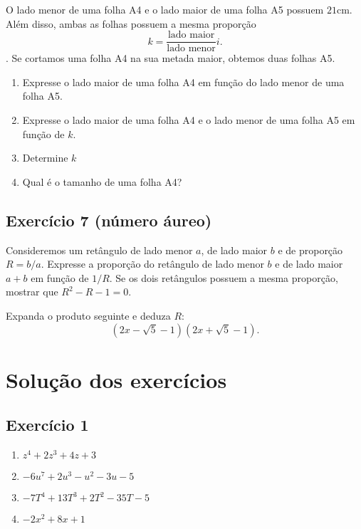 O lado menor de uma folha A4 e o lado maior de uma folha A5 possuem $21$cm. Além
disso, ambas as folhas possuem a mesma proporção
$$k = \frac{\text{lado maior}}{\text{lado menor}}i.$$. Se cortamos uma folha A4
na sua metada maior, obtemos duas folhas A5.

\begin{enumerate}
\item Expresse o lado maior de uma folha A4 em função do lado menor de uma folha
  A5.
\item Expresse o lado maior de uma folha A4 e o lado menor de uma folha A5 em
  função de $k$.
\item Determine $k$
\item Qual é o tamanho de uma folha A4?
\end{enumerate}

\subsection*{Exercício 7 (número áureo)}

\begin{center}
\end{center}

Consideremos um retângulo de lado menor $a$, de lado maior $b$ e de
proporção $R = b/a$. Expresse a proporção do retângulo de lado menor $b$ e de
lado maior $a+b$ em função de $1/R$. Se os dois retângulos possuem a mesma
proporção, mostrar que $R^2 - R - 1 = 0$.

Expanda o produto seguinte e deduza $R$:
$$\left(2x-\sqrt{5}-1\right) \left(2x+\sqrt{5}-1\right).$$

\section{Solução dos exercícios}

\subsection*{Exercício 1}

\begin{enumerate}
\item $z^4 + 2z^3 + 4z + 3$
\item $-6u^7 + 2u^3 -u^2 - 3u - 5$
\item $-7T^4 + 13T^3 + 2T^2 -35T -5$
\item $-2x^2 + 8x + 1$
\end{enumerate}

